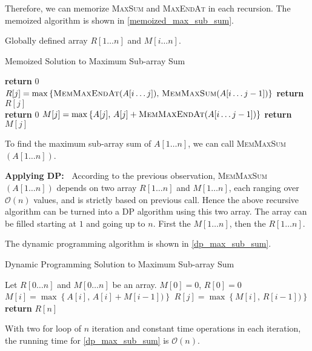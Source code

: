 \begin{homeworkProblem}
Therefore, we can memorize \textsc{MaxSum} and \textsc{MaxEndAt} in each recursion.
The memoized algorithm is shown in \cref{memoized_max_sub_sum}.

Globally defined array $R[1 \ldots n]$ and $M[i \ldots n]$.

\begin{algorithm}[H]
    \caption{Memoized Solution to Maximum Sub-array Sum}\label{memoized_max_sub_sum}
    \begin{algorithmic}[1]
                \State \textbf{return } $0$
            \EndIf
            \State $R[j] = \max\left\{\text{\textsc{MemMaxEndAt}}(A[i\ldots j])\text{,\ }\text{\textsc{MemMaxSum}}(A[i\ldots j-1])\right\}$
            \EndIf
            \State \textbf{return } $R[j]$
        \EndProcedure
        \\\hrulefill
                \State \textbf{return } $0$
            \EndIf
            \State $M[j] = \max\left\{A[j]\text{,\ }A[j] + \text{\textsc{MemMaxEndAt}}(A[i\ldots j-1])\right\}$
            \EndIf
            \State \textbf{return } $M[j]$
        \EndProcedure
    \end{algorithmic}
\end{algorithm}

To find the maximum sub-array sum of $A[1\ldots n]$, we can call \textsc{MemMaxSum}$(A[1\ldots n])$.

\pagebreak
\noindent
\textbf{Applying DP:\ }
According to the previous observation, \textsc{MemMaxSum}$(A[1\ldots n])$ depends on two array
$R[1\ldots n]$ and $M[1\ldots n]$, each ranging over $\mathcal{O}(n)$ values, and is strictly
based on previous call. Hence the above recursive algorithm can be turned into a DP
algorithm using this two array. The array can be filled starting at $1$ and going up to $n$.
First the $M[1\ldots n]$, then the $R[1\dots n]$.

The dynamic programming algorithm is shown in \cref{dp_max_sub_sum}.

\begin{algorithm}[H]
    \caption{Dynamic Programming Solution to Maximum Sub-array Sum}\label{dp_max_sub_sum}
    \begin{algorithmic}[1]
            \State Let $R[0\ldots n]$ and $M[0\ldots n]$ be an array.
            \State $M[0] = 0$, $R[0] = 0$
                \State $M[i] = \max\left\{A[i]\text{,\ }A[i] + M[i-1])\right\}$
            \EndFor
                \State $R[j] = \max\left\{M[i]\text{,\ }R[i-1])\right\}$
            \EndFor
            \State \textbf{return }$R[n]$
        \EndProcedure
    \end{algorithmic}
\end{algorithm}

With two for loop of $n$ iteration and constant time operations in each iteration, the running time for \cref{dp_max_sub_sum} is $\mathcal{O}(n)$.



\end{homeworkProblem}
